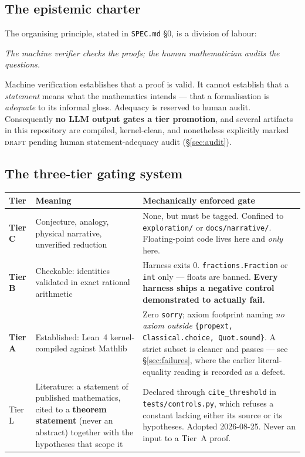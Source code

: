 \documentclass[11pt,a4paper]{article}
\newcommand{\tA}{\textcolor{TierA}{\textbf{Tier A}}}
\newcommand{\tB}{\textcolor{TierB}{\textbf{Tier B}}}
\newcommand{\tC}{\textcolor{TierC}{\textbf{Tier C}}}
\newcommand{\tL}{\textsf{Tier L}}
\theoremstyle{definition}
\theoremstyle{plain}
\begin{document}
\subsection{The epistemic charter}

The organising principle, stated in \texttt{SPEC.md} \S0, is a division of labour:

\begin{center}
\emph{The machine verifier checks the proofs; the human mathematician audits the questions.}
\end{center}

Machine verification establishes that a proof is valid. It cannot establish that a
\emph{statement} means what the mathematics intends --- that a formalisation is
\emph{adequate} to its informal gloss. Adequacy is reserved to human audit. Consequently
\textbf{no LLM output gates a tier promotion}, and several artifacts in this repository are
compiled, kernel-clean, and nonetheless explicitly marked \textsc{draft} pending human
statement-adequacy audit (\S\ref{sec:audit}).

\subsection{The three-tier gating system}

\begin{center}
\begin{tabular}{@{}p{1.9cm}p{4.6cm}p{8.0cm}@{}}
\toprule
\textbf{Tier} & \textbf{Meaning} & \textbf{Mechanically enforced gate} \\
\midrule
\tC{} & Conjecture, analogy, physical narrative, unverified reduction & None, but must be tagged. Confined to \texttt{exploration/} or \texttt{docs/narrative/}. Floating-point code lives here and \emph{only} here. \\
\tB{} & Checkable: identities validated in exact rational arithmetic & Harness exits 0. \texttt{fractions.Fraction} or \texttt{int} only --- floats are banned. \textbf{Every harness ships a negative control demonstrated to actually fail.} \\
\tA{} & Established: Lean~4 \cite{lean4} kernel-compiled against Mathlib \cite{mathlib} & Zero \texttt{sorry}; axiom footprint naming \emph{no axiom outside} \texttt{\{propext, Classical.choice, Quot.sound\}}. A strict subset is cleaner and passes --- see \S\ref{sec:failures}, where the earlier literal-equality reading is recorded as a defect. \\
\tL{} & Literature: a statement of published mathematics, cited to a \textbf{theorem statement} (never an abstract) together with the hypotheses that scope it & Declared through \texttt{cite\_threshold} in \texttt{tests/controls.py}, which refuses a constant lacking either its source or its hypotheses. Adopted 2026-08-25. Never an input to a Tier~A proof. \\
\bottomrule
\end{tabular}
\end{center}
\end{document}
